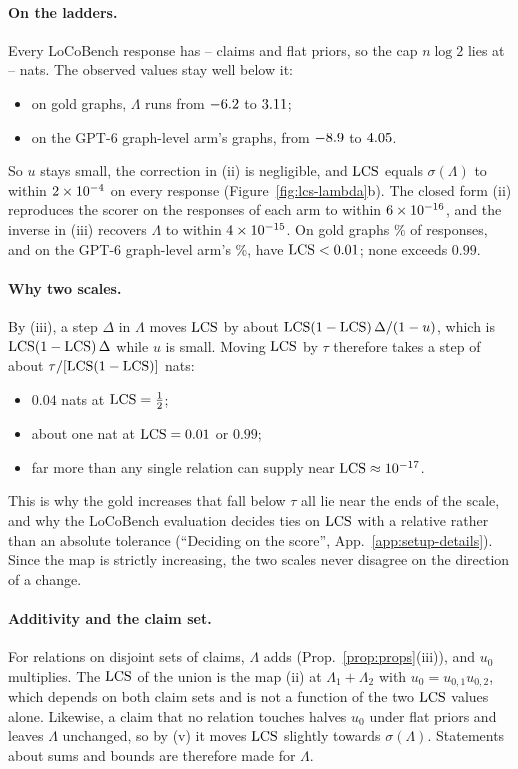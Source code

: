 \paragraph{On the ladders.} Every LoCoBench response has \lclNMin--\lclNMax{} claims and flat
priors, so the cap $n\log2$ lies at \lclLamCapMin--\lclLamCapMax{} nats. The observed values stay
well below it:
\begin{itemize}[leftmargin=1.2em,itemsep=1pt,topsep=2pt]
\item on gold graphs, $\Lambda$ runs from $-6.2$ to $3.11$;
\item on the GPT-6 graph-level arm's graphs, from $-8.9$ to $4.05$.
\end{itemize}
So $u$ stays small, the correction in (ii) is negligible, and $\mathrm{LCS}$ equals $\sigma(\Lambda)$ to
within $2\times10^{-4}$ on every response (Figure~\ref{fig:lcs-lambda}b). The closed form (ii)
reproduces the scorer on the \lclNGold{} responses of each arm to within $6\times10^{-16}$, and the inverse
in (iii) recovers $\Lambda$ to within $4\times10^{-15}$. On gold graphs \lclLowGold\% of responses, and on
the GPT-6 graph-level arm's \lclLowGpt\%, have $\mathrm{LCS}<0.01$; none exceeds $0.99$.

\paragraph{Why two scales.} By (iii), a step $\Delta$ in $\Lambda$ moves $\mathrm{LCS}$ by about
$\mathrm{LCS}(1-\mathrm{LCS})\,\Delta/(1-u)$, which is $\mathrm{LCS}(1-\mathrm{LCS})\,\Delta$ while $u$ is small. Moving $\mathrm{LCS}$ by
$\tau$ therefore takes a step of about $\tau/[\mathrm{LCS}(1-\mathrm{LCS})]$ nats:
\begin{itemize}[leftmargin=1.2em,itemsep=1pt,topsep=2pt]
\item $0.04$ nats at $\mathrm{LCS}=\frac12$;
\item about one nat at $\mathrm{LCS}=0.01$ or $0.99$;
\item far more than any single relation can supply near $\mathrm{LCS}\approx10^{-17}$.
\end{itemize}
This is why the gold increases that fall below $\tau$ all lie near the ends of the scale, and why
the LoCoBench evaluation decides ties on $\mathrm{LCS}$ with a relative rather than an absolute tolerance
(``Deciding on the score'', App.~\ref{app:setup-details}). Since the map is strictly increasing,
the two scales never disagree on the direction of a change.

\paragraph{Additivity and the claim set.} For relations on disjoint sets of claims, $\Lambda$ adds
(Prop.~\ref{prop:props}(iii)), and $u_0$ multiplies. The $\mathrm{LCS}$ of the union is the map (ii) at
$\Lambda_1+\Lambda_2$ with $u_0=u_{0,1}u_{0,2}$, which depends on both claim sets and is not a
function of the two $\mathrm{LCS}$ values alone. Likewise, a claim that no relation touches halves $u_0$
under flat priors and leaves $\Lambda$ unchanged, so by (v) it moves $\mathrm{LCS}$ slightly towards
$\sigma(\Lambda)$. Statements about sums and bounds are therefore made for $\Lambda$.

